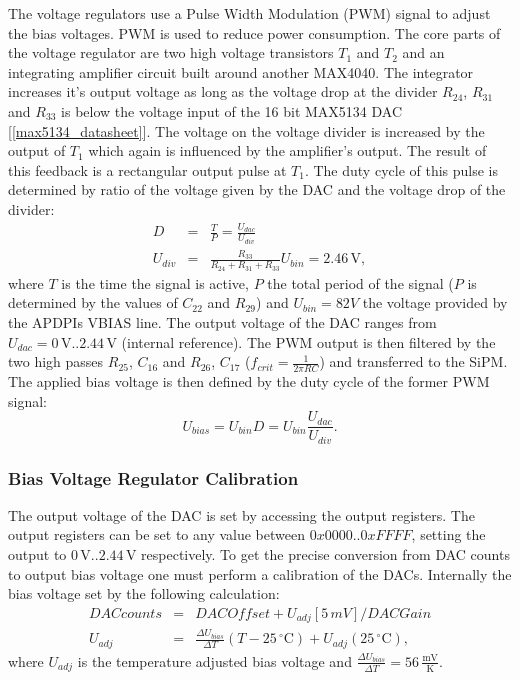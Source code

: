 \documentclass[]{article}
\begin{document}
The voltage regulators use a Pulse Width Modulation (PWM) signal to adjust the bias voltages. PWM is used to reduce power consumption.
The core parts of the voltage regulator are two high voltage transistors $T_1$ and $T_2$ and an integrating amplifier circuit built around another MAX4040. The integrator increases
it's output voltage as long as the voltage drop at the divider $R_{24}$, $R_{31}$ and $R_{33}$ is below the voltage input of the 16 bit MAX5134 DAC [\ref{max5134_datasheet}].
The voltage on the voltage divider is increased by the output of $T_1$ which again is influenced by the amplifier's output. The result of this feedback is a rectangular output
pulse at $T_1$. The duty cycle of this pulse is determined by ratio of the voltage given by the DAC and the voltage drop of the divider:
	\begin{eqnarray}
		D &=& \frac{T}{P} = \frac{U_{dac}}{U_{div}} \\
		U_{div} &=& \frac{R_{33}}{R_{24} + R_{31} + R_{33}} U_{bin} = 2.46\,\text{V},
	\end{eqnarray}
where $T$ is the time the signal is active, $P$ the total period of the signal ($P$ is determined by the values of $C_{22}$ and $R_{29}$) and $U_{bin}=82V$ the voltage provided by the 
APDPIs VBIAS line. The output voltage of the DAC ranges from $U_{dac}=0\, \text{V} .. 2.44\, \text{V}$ (internal reference). The PWM output is then filtered by the two high passes 
$R_{25}$, $C_{16}$ and $R_{26}$, $C_{17}$ ($f_{crit} = \frac{1}{2 \pi RC}$) and transferred to the SiPM. The applied bias voltage is then defined by the duty cycle of the former 
PWM signal:
	\begin{equation}
		U_{bias} = U_{bin} D = U_{bin} \frac{U_{dac}}{U_{div}}.
	\end{equation}

\subsubsection{Bias Voltage Regulator Calibration}
The output voltage of the DAC is set by accessing the output registers. The output registers can be set to any value between $0x0000 .. 0xFFFF$, setting the output to 
$0\, \text{V}..2.44\, \text{V}$ respectively. To get the precise conversion from DAC counts to output bias voltage one must perform a calibration of the DACs. Internally 
the bias voltage set by the following calculation:
	\begin{eqnarray}
		DACcounts &=& DACOffset + U_{adj}[5\,mV]/DACGain \\
		U_{adj} &=& \frac{\Delta U_{bias}}{\Delta T}(T - 25\,^{\circ} \text{C}) + U_{adj}(25\,^{\circ} \text{C}),
	\end{eqnarray} 
where $U_{adj}$ is the temperature adjusted bias voltage and $\frac{\Delta U_{bias}}{\Delta T} = 56\,\frac{\text{mV}}{\text{K}}$. 
\end{document}
